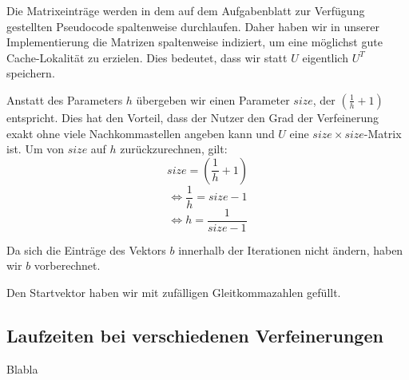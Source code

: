 \documentclass{article}
\begin{document}
Die Matrixeinträge werden in dem auf dem Aufgabenblatt zur Verfügung gestellten Pseudocode spaltenweise durchlaufen. Daher haben wir in unserer Implementierung die Matrizen spaltenweise indiziert, um eine möglichst gute Cache-Lokalität zu erzielen. Dies bedeutet, dass wir statt $U$ eigentlich $U^T$ speichern.

Anstatt des Parameters $h$ übergeben wir einen Parameter $size$, der $\left(\frac{1}{h}+1\right)$ entspricht. Dies hat den Vorteil, dass der Nutzer den Grad der Verfeinerung exakt ohne viele Nachkommastellen angeben kann und $U$ eine $size \times size$-Matrix ist.
Um von $size$ auf $h$ zurückzurechnen, gilt:
$$size = \left(\frac{1}{h} + 1\right)$$
$$\Leftrightarrow \frac{1}{h} = size - 1$$
$$\Leftrightarrow h = \frac{1}{size - 1}$$
 
Da sich die Einträge des Vektors $b$ innerhalb der Iterationen nicht ändern, haben wir $b$ vorberechnet.

Den Startvektor haben wir mit zufälligen Gleitkommazahlen gefüllt.

\subsection{Laufzeiten bei verschiedenen Verfeinerungen}
Blabla
\end{document}
